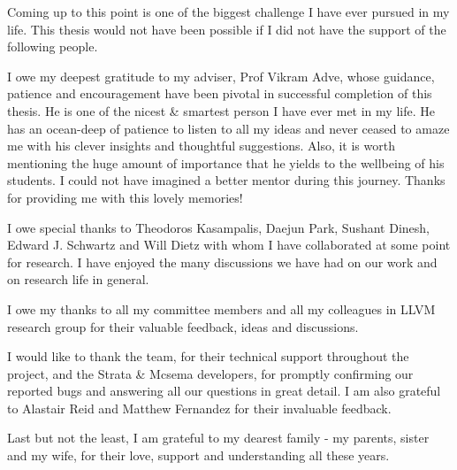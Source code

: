 Coming up to this point is one of the biggest challenge I have ever pursued
in my life. This thesis would not have been possible if I did not have the 
support of the following people.

I owe my deepest gratitude to my adviser, Prof Vikram Adve, whose guidance, patience and encouragement
have been pivotal in successful completion of this thesis. He is one of the nicest \& smartest
person I have ever met in my life. He has an ocean-deep of patience to listen to all my ideas and
never ceased to amaze me with his clever insights and thoughtful suggestions. 
Also, it is worth mentioning the huge amount of importance that he yields to the wellbeing  of his
students. I could not have imagined a better mentor during this journey. 
Thanks for providing me with this lovely memories! 

I owe special thanks to Theodoros Kasampalis, Daejun Park, Sushant Dinesh, Edward J. Schwartz and Will Dietz
with whom I have collaborated at some point for research. I have enjoyed the many discussions we have had on 
our work and on research life in general.

I owe my thanks to all my committee members and all my colleagues in LLVM research group for
their valuable feedback, ideas and discussions. 

I would like to thank the \K team, for their technical support throughout the project, and
the Strata \& Mcsema developers, for promptly confirming our reported bugs and answering
all our questions in great detail. I am also grateful to Alastair Reid and Matthew Fernandez for 
their invaluable feedback.

Last but not the least, I am grateful to my dearest family - my parents, sister and my wife,
for their love, support and understanding all these years.